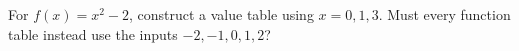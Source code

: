 For $f(x)=x^2-2$, construct a value table using $x=0,1,3$. Must every function table instead use the inputs $-2,-1,0,1,2$?
